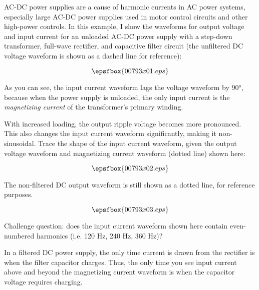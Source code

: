 

AC-DC power supplies are a cause of harmonic currents in AC power systems, especially large AC-DC power supplies used in motor control circuits and other high-power controls.  In this example, I show the waveforms for output voltage and input current for an unloaded AC-DC power supply with a step-down transformer, full-wave rectifier, and capacitive filter circuit (the unfiltered DC voltage waveform is shown as a dashed line for reference):

$$\epsfbox{00793x01.eps}$$

As you can see, the input current waveform lags the voltage waveform by 90$^{o}$, because when the power supply is unloaded, the only input current is the {\it magnetizing current} of the transformer's primary winding.

With increased loading, the output ripple voltage becomes more pronounced.  This also changes the input current waveform significantly, making it non-sinusoidal.  Trace the shape of the input current waveform, given the output voltage waveform and magnetizing current waveform (dotted line) shown here:

$$\epsfbox{00793x02.eps}$$

The non-filtered DC output waveform is still shown as a dotted line, for reference purposes.







$$\epsfbox{00793x03.eps}$$

\vskip 10pt

Challenge question: does the input current waveform shown here contain even-numbered harmonics (i.e. 120 Hz, 240 Hz, 360 Hz)?







In a filtered DC power supply, the only time current is drawn from the rectifier is when the filter capacitor charges.  Thus, the only time you see input current above and beyond the magnetizing current waveform is when the capacitor voltage requires charging.

